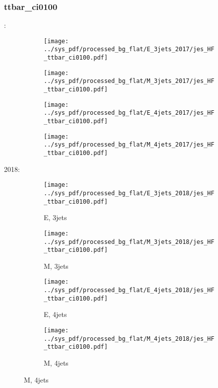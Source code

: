 \documentclass{beamer}
\begin{document}
\begin{frame}
\frametitle{ttbar_ci0100}
\fontsize{5}{1}:
\begin{figure}
\centering
\begin{subfigure}[b]{0.24\textwidth}
\texttt{[image: ../sys\_pdf/processed\_bg\_flat/E\_3jets\_2017/jes\_HF\_ttbar\_ci0100.pdf]}
\end{subfigure}
\begin{subfigure}[b]{0.24\textwidth}
\texttt{[image: ../sys\_pdf/processed\_bg\_flat/M\_3jets\_2017/jes\_HF\_ttbar\_ci0100.pdf]}
\end{subfigure}
\begin{subfigure}[b]{0.24\textwidth}
\texttt{[image: ../sys\_pdf/processed\_bg\_flat/E\_4jets\_2017/jes\_HF\_ttbar\_ci0100.pdf]}
\end{subfigure}
\begin{subfigure}[b]{0.24\textwidth}
\texttt{[image: ../sys\_pdf/processed\_bg\_flat/M\_4jets\_2017/jes\_HF\_ttbar\_ci0100.pdf]}
\end{subfigure}
\end{figure}
2018:
\begin{figure}
\centering
\begin{subfigure}[b]{0.24\textwidth}
\texttt{[image: ../sys\_pdf/processed\_bg\_flat/E\_3jets\_2018/jes\_HF\_ttbar\_ci0100.pdf]}
\captionsetup{font=tiny}
\caption{E, 3jets}
\end{subfigure}
\begin{subfigure}[b]{0.24\textwidth}
\texttt{[image: ../sys\_pdf/processed\_bg\_flat/M\_3jets\_2018/jes\_HF\_ttbar\_ci0100.pdf]}
\captionsetup{font=tiny}
\caption{M, 3jets}
\end{subfigure}
\begin{subfigure}[b]{0.24\textwidth}
\texttt{[image: ../sys\_pdf/processed\_bg\_flat/E\_4jets\_2018/jes\_HF\_ttbar\_ci0100.pdf]}
\captionsetup{font=tiny}
\caption{E, 4jets}
\end{subfigure}
\begin{subfigure}[b]{0.24\textwidth}
\texttt{[image: ../sys\_pdf/processed\_bg\_flat/M\_4jets\_2018/jes\_HF\_ttbar\_ci0100.pdf]}
\captionsetup{font=tiny}
\caption{M, 4jets}
\end{subfigure}
\end{figure}
\end{frame}
\end{document}
